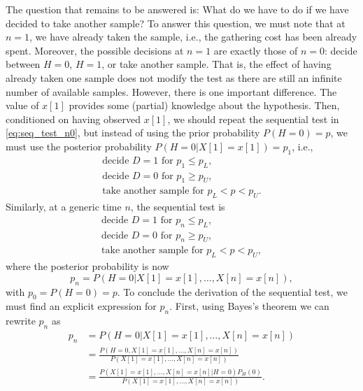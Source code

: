The question that remains to be answered is: What do we have to do if we have decided to take another sample? To answer this question, we must note that at $n = 1$, we have already taken the sample, i.e., the gathering cost has been already spent. Moreover, the possible decisions at $n = 1$ are exactly those of $n = 0$: decide between $H = 0$, $H = 1$, or take another sample. That is, the effect of having already taken one sample does not modify the test as there are still an infinite number of available samples. However, there is one important difference. The value of $x[1]$ provides some (partial) knowledge about the hypothesis. Then, conditioned on having observed $x[1]$, we should repeat the sequential test in \eqref{eq:seq_test_n0}, but instead of using the prior probability $P(H = 0) = p$, we must use the posterior probability $P(H = 0 | X[1] = x[1]) = p_1$, i.e.,
\begin{equation*}
	\begin{array}{l}
		\text{decide } D = 1 \text{ for } p_1 \leq p_L, \\
		\text{decide } D = 0 \text{ for } p_1 \geq p_U, \\
		\text{take another sample for } p_L < p < p_U.
	\end{array}
\end{equation*}
Similarly, at a generic time $n$, the sequential test is
\begin{equation}
	\label{eq:seq_test}
	\begin{array}{l}
		\text{decide } D = 1 \text{ for } p_n \leq p_L, \\
		\text{decide } D = 0 \text{ for } p_n \geq p_U, \\
		\text{take another sample for } p_L < p < p_U,
	\end{array}
\end{equation}
where the posterior probability is now
\begin{equation*}
	p_n = P(H = 0 | X[1] = x[1], \ldots, X[n] = x[n]),
\end{equation*}
with $p_0 = P(H = 0) = p$. To conclude the derivation of the sequential test, we must find an explicit expression for $p_n$. First, using Bayes's theorem we can rewrite $p_n$ as
\begin{align*}
	p_n &= P(H = 0 | X[1] = x[1], \ldots, X[n] = x[n]) \\ &= \frac{P(H = 0 , X[1] = x[1], \ldots, X[n] = x[n])}{P(X[1] = x[1], \ldots, X[n] = x[n])} \\ &= \frac{P(X[1] = x[1], \ldots, X[n] = x[n] | H = 0) P_H(0)}{P(X[1] = x[1], \ldots, X[n] = x[n])}.
\end{align*}
